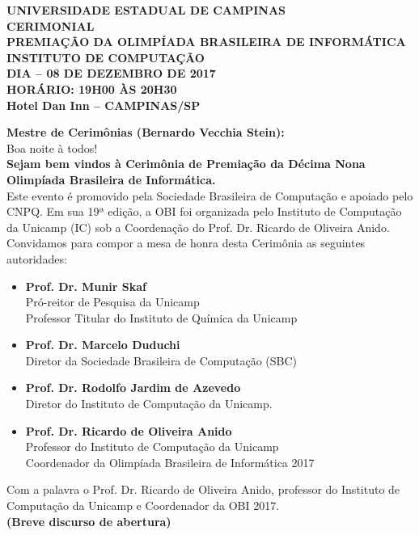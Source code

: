 \documentclass{article}
\begin{document}
\setlength{\parindent}{0pt}

\begin{center}
    \textbf{
        UNIVERSIDADE ESTADUAL DE CAMPINAS\\
        CERIMONIAL\\
        \bigskip
         PREMIAÇÃO DA OLIMPÍADA BRASILEIRA DE INFORMÁTICA\\
        INSTITUTO DE COMPUTAÇÃO\\
        DIA – 08 DE DEZEMBRO DE 2017\\
        HORÁRIO: 19H00 ÀS 20H30\\
        Hotel Dan Inn – CAMPINAS/SP 
    }
\end{center}

\textbf{Mestre de Cerimônias (Bernardo Vecchia Stein):}\\
Boa noite à todos!\\
\textbf{Sejam bem vindos à Cerimônia de Premiação da Décima Nona Olimpíada Brasileira de Informática.}\\
\color{blue}Este evento é promovido pela Sociedade Brasileira de Computação e apoiado pelo CNPQ. Em sua 19ª edição, a OBI foi organizada pelo Instituto de Computação da Unicamp (IC) sob a Coordenação do Prof. Dr. Ricardo de Oliveira Anido.\\
\color{black}
Convidamos para compor a mesa de honra desta Cerimônia as seguintes autoridades:
\begin{itemize}
\item \textbf{Prof. Dr. Munir Skaf}\\
Pró-reitor de Pesquisa da Unicamp\\
Professor Titular do Instituto de Química da Unicamp

\item \textbf{Prof. Dr. Marcelo Duduchi}\\
Diretor da Sociedade Brasileira de Computação (SBC)

\item \textbf{Prof. Dr. Rodolfo Jardim de Azevedo}\\
Diretor do Instituto de Computação da Unicamp.
\item \textbf{Prof. Dr. Ricardo de Oliveira Anido}\\
Professor do Instituto de Computação da Unicamp\\
Coordenador da Olimpíada Brasileira de Informática 2017
\end{itemize}

Com a palavra o Prof. Dr. Ricardo de Oliveira Anido, professor do Instituto de Computação da Unicamp e Coordenador da OBI 2017.\\
\color{red}\textbf{(Breve discurso de abertura)}\color{black}\\
\end{document}
